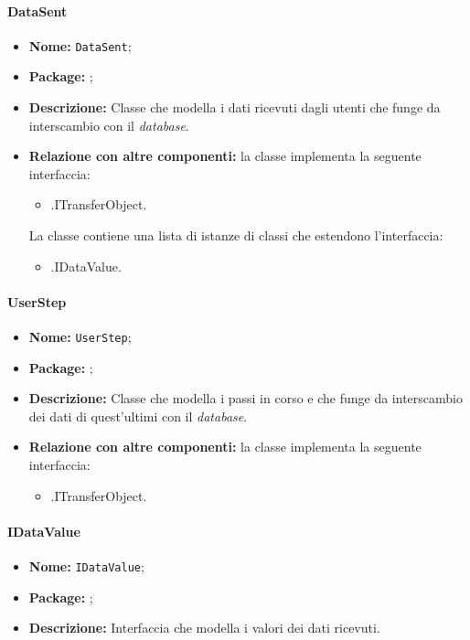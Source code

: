 \paragraph{DataSent}
\begin{itemize}
\item \textbf{Nome:} \texttt{DataSent};
\item \textbf{Package:} \texttt{\smodel{}};
\item \textbf{Descrizione:} Classe che modella i dati ricevuti dagli utenti che funge da interscambio  con il \textit{database}.
\item \textbf{Relazione con altre componenti:} la classe implementa la seguente interfaccia:
		\begin{itemize}
			\item \smodel{}.ITransferObject.
		\end{itemize}
				La classe contiene una lista di istanze di classi che estendono l'interfaccia:
		\begin{itemize}
			\item \smodel{}.IDataValue.
		\end{itemize}
\end{itemize}

\paragraph{UserStep}
\begin{itemize}
\item \textbf{Nome:} \texttt{UserStep};
\item \textbf{Package:} \texttt{\smodel{}};
\item \textbf{Descrizione:} Classe che modella i passi in corso e che funge da interscambio dei dati di quest'ultimi con il \textit{database}.
\item \textbf{Relazione con altre componenti:} la classe implementa la seguente interfaccia:
		\begin{itemize}
			\item \smodel{}.ITransferObject.
		\end{itemize}
\end{itemize}

\paragraph{IDataValue}
\begin{itemize}
\item \textbf{Nome:} \texttt{IDataValue};
\item \textbf{Package:} \texttt{\smodel{}};
\item \textbf{Descrizione:} Interfaccia che modella i valori dei dati ricevuti.
\end{itemize}

